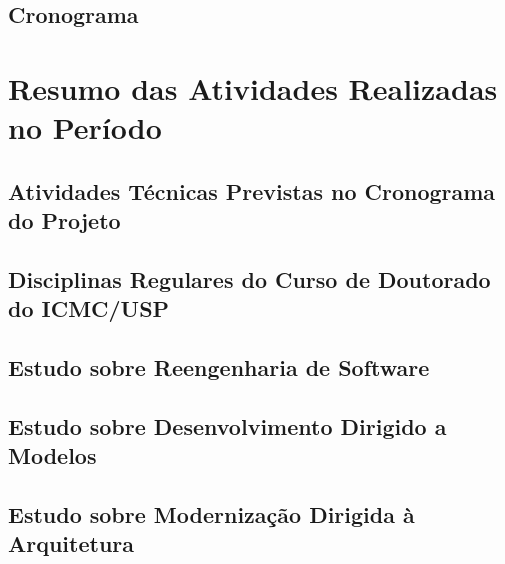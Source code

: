 \documentclass[a4paper,11pt]{article}
\begin{document}
		\subsection{Cronograma}\label{cronograma}
			

\section{Resumo das Atividades Realizadas no Período}\label{atividades_realizadas}

	

	\subsection{Atividades Técnicas Previstas no Cronograma do Projeto}

		

	\subsection{Disciplinas Regulares do Curso de Doutorado do ICMC/USP} %
		\label{sub:disciplinas_regulares_do_curso_de_doutorado_do_icmc_usp}
		 
		 
	
	\subsection{Estudo sobre Reengenharia de Software} %
	\label{sub:estudo_sobre_reengenharia_de_software}
		 
		 
		
	 \subsection{Estudo sobre Desenvolvimento Dirigido a Modelos} %
	 	\label{sub:estudo_sobre_desenvolvimento_dirigido_a_modelos}
	 	
	 	

	 \subsection{Estudo sobre Modernização Dirigida à Arquitetura} %
	 \label{sub:estudo_sobre_moderniza_o_dirigida_arquitetura}
	 	
\end{document}
